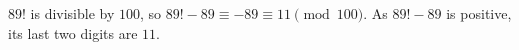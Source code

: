 $89!$ is divisible by $100$, so $89!-89\equiv-89\equiv11\pmod{100}$. As $89!-89$ is positive, its last two digits are $\boxed{11}$.
